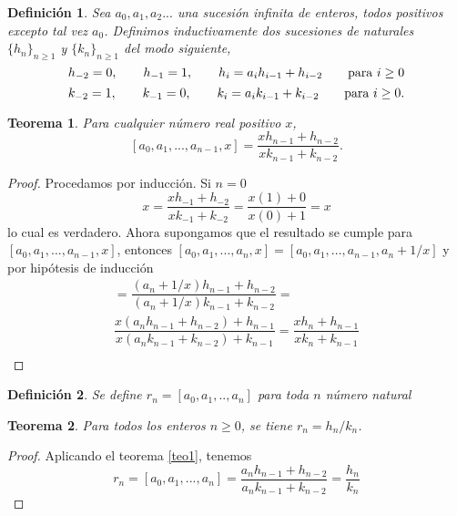 \documentclass[11pt, article]{article}
\newtheorem{theorem}{Teorema} %
\newtheorem{definition}{Definición}
\begin{document}
    \begin{definition}
    
    
    Sea $a_0,a_1,a_2...$ una sucesión infinita de enteros, todos positivos excepto tal vez $a_0$. Definimos inductivamente dos sucesiones de naturales $\{h_n\}_{n\geq 1}$ y $\{k_n\}_{n\geq 1}$ del modo siguiente,
        \[
        h_{-2}=0, \qquad h_{-1} =1, \qquad h_i=a_ih_{i-1} + h_{i-2} \qquad \textnormal{para } i\geq 0
        \]
        \[
        k_{-2}=1, \qquad k_{-1} =0, \qquad k_i=a_ik_{i-1} + k_{i-2} \qquad \textnormal{para } i\geq 0.
        \]
        \end{definition}
        \begin{theorem}
        Para cualquier número real positivo $x$,
        \[
        [a_0,a_1,...,a_{n-1}, x]=\dfrac{xh_{n-1}+h_{n-2}}{xk_{n-1}+k_{n-2}}. \label{teo1}
        \] 
        \end{theorem}
    \begin{proof} Procedamos por inducción. Si $n=0$
        \[
        x=\dfrac{xh_{-1}+h_{-2}}{xk_{-1}+k_{-2}}=\dfrac{x(1)+0}{x(0)+1}=x
        \]
        lo cual es verdadero. Ahora supongamos que el resultado se cumple para $[a_0,a_1,...,a_{n-1},x]$, entonces $[a_0,a_1,...,a_n,x]=[a_0,a_1,...,a_{n-1},a_n + 1/x]$ y por hipótesis de inducción
    \begin{align*}
        [a_0,a_1,...,a_{n-1},a_n + \dfrac{1}{x}]= 
            \dfrac{(a_n+1/x)h_{n-1}+h_{n-2}}{(a_n+1/x)k_{n-1}+k_{n-2}}= \\
            \dfrac{x(a_nh_{n-1}+h_{n-2})+h_{n-1}}{x(a_nk_{n-1}+k_{n-2})+k_{n-1}}= 
            \dfrac{xh_n+h_{n-1}}{xk_n+k_{n-1}}\\
    \end{align*}
    \end{proof}
    
    
    \begin{definition} Se define $r_n=[a_0,a_1,..,a_n]$ para toda $n$ número natural
    \end{definition}
    
    \begin{theorem}
        Para todos los enteros $n \geq 0$, se tiene $r_n=h_n/k_n$.
    \end{theorem} 

    
    \begin{proof}
        Aplicando el teorema \ref{teo1}, tenemos
    \[
    r_n=[a_0,a_1,...,a_n]=\dfrac{a_nh_{n-1}+h_{n-2}}{a_nk_{n-1}+k_{n-2}}=\dfrac{h_n}{k_n}\]
    \end{proof} 
    
\end{document}
